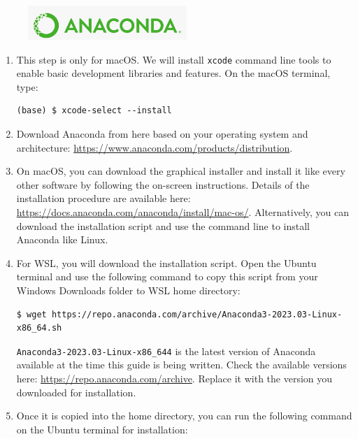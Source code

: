 \documentclass[12pt]{article}
\begin{document}
\begin{figure}[H]
    \centering
    \includegraphics[width=6cm]{anaconda-logo.png}
\end{figure}

\begin{enumerate}[label={\arabic*.}, leftmargin= 0.6 cm,itemsep = 0.25cm,topsep= .25cm]


\item This step is only for macOS. We will install \texttt{xcode} command line tools to enable basic development libraries and features. On the macOS terminal, type:

\begin{lstlisting}[style=terminal]
(base) $ xcode-select --install
\end{lstlisting}


\item Download Anaconda from here based on your operating system and architecture: \url{https://www.anaconda.com/products/distribution}.

\item On macOS, you can download the graphical installer and install it like every other software by following the on-screen instructions. Details of the installation procedure are available here: \url{https://docs.anaconda.com/anaconda/install/mac-os/}. Alternatively, you can download the installation script and use the command line to install Anaconda like Linux.

\item For WSL, you will download the installation script. Open the Ubuntu terminal and use the following command to copy this script from your Windows Downloads folder to WSL home directory:

\begin{lstlisting}[style=terminal]
$ wget https://repo.anaconda.com/archive/Anaconda3-2023.03-Linux-x86_64.sh
\end{lstlisting}

\texttt{Anaconda3-2023.03-Linux-x86\_644} is the latest version of Anaconda available at the time this guide is being written. Check the available versions here: \url{https://repo.anaconda.com/archive}. Replace it with the version you downloaded for installation.

\item Once it is copied into the home directory, you can run the following command on the Ubuntu terminal for installation:


\end{enumerate}
\end{document}

